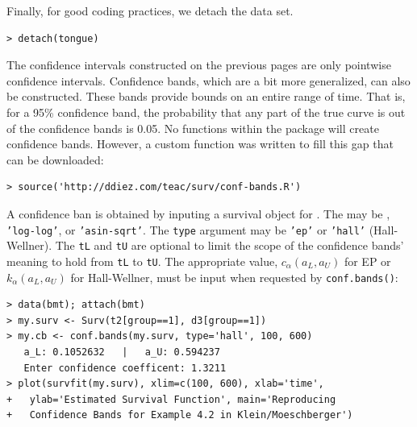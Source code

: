 \documentclass[11pt]{article}
\begin{document}
Finally, for good coding practices, we detach the  data set.
\begin{verbatim}
> detach(tongue)
\end{verbatim}



\pagebreak

{} \vspace{-1mm}\par
{}
\label{confBands}

The confidence intervals constructed on the previous pages are only pointwise confidence intervals. Confidence bands, which are a bit more generalized, can also be constructed. These bands provide bounds on an entire range of time. That is, for a 95\% confidence band, the probability that any part of the true curve is out of the confidence bands is 0.05. No functions within the package  will create confidence bands. However, a custom function was written to fill this gap that can be downloaded:
\begin{verbatim}
> source('http://ddiez.com/teac/surv/conf-bands.R')
\end{verbatim}
A confidence ban is obtained by inputing a survival object for . The  may be ,  \texttt{'log-log'}, or \texttt{'asin-sqrt'}. The \texttt{type} argument may be \texttt{'ep'} or \texttt{'hall'} (Hall-Wellner). The \texttt{tL} and \texttt{tU} are optional to limit the scope of the confidence bands' meaning to hold from \texttt{tL} to \texttt{tU}. The appropriate value, $c_\alpha(a_L, a_U)$ for EP or $k_\alpha(a_L, a_U)$ for Hall-Wellner, must be input when requested by \texttt{conf.bands()}:
\begin{verbatim}
> data(bmt); attach(bmt)
> my.surv <- Surv(t2[group==1], d3[group==1])
> my.cb <- conf.bands(my.surv, type='hall', 100, 600)
   a_L: 0.1052632   |   a_U: 0.594237
   Enter confidence coefficent: 1.3211
> plot(survfit(my.surv), xlim=c(100, 600), xlab='time',
+   ylab='Estimated Survival Function', main='Reproducing 
+   Confidence Bands for Example 4.2 in Klein/Moeschberger')
\end{verbatim}
\end{document}
